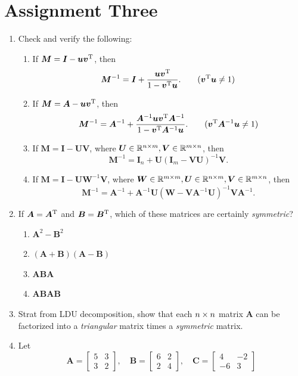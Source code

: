 \section{Assignment Three}
\begin{enumerate}
\item
Check and verify the following:
\begin{enumerate}
\item
If $\bm M=\bm I-\bm u\bm v^{\mathrm T}$, then \[\bm M^{-1}=\bm I+\frac{\bm u\bm v^{\mathrm T}}{1-\bm v^{\mathrm T}\bm u}.\qquad(\bm v^{\mathrm T}\bm u\ne1)\]
\item
If $\bm M=\bm A-\bm u\bm v^{\mathrm T}$, then \[\bm M^{-1}=\bm A^{-1}+\frac{\bm A^{-1}\bm u\bm v^{\mathrm T}\bm A^{-1}}{1-\bm v^{\mathrm T}\bm A^{-1}\bm u}.\qquad(\bm v^{\mathrm T}\bm A^{-1}\bm u\ne1)\]
\item
If $\bm M=\bm I-\bm U\bm V$, where $\bm U\in\mathbb{R}^{n\times m},\bm V\in\mathbb{R}^{m\times n}$, then \[\bm M^{-1}=\bm I_n+\bm U(\bm I_m-\bm V\bm U)^{-1}\bm V.\]
\item
If $\bm M=\bm I-\bm U\bm W^{-1}\bm V$, where $\bm W\in\mathbb{R}^{m\times m},\bm U\in\mathbb{R}^{n\times m},\bm V\in\mathbb{R}^{m\times n}$, then \[\bm M^{-1}=\bm A^{-1}+\bm A^{-1}\bm U(\bm W-\bm V\bm A^{-1}\bm U)^{-1}\bm V\bm A^{-1}.\]
\end{enumerate}
\item
If $\bm A=\bm A^{\mathrm T}$ and $\bm B=\bm B^{\mathrm T}$, which of these matrices are certainly \textit{symmetric}?
\begin{enumerate}
\item
$\bm A^2-\bm B^2$
\item
$(\bm A+\bm B)(\bm A-\bm B)$
\item
$\bm{ABA}$
\item
$\bm{ABAB}$
\end{enumerate}
\item
Strat from LDU decomposition, show that each $n\times n$ matrix $\bm A$ can be factorized into a \textit{triangular} matrix times a \textit{symmetric} matrix.
\item
Let
\[
\bm A=\begin{bmatrix}
5&3\\3&2
\end{bmatrix},\quad\bm B=\begin{bmatrix}
6&2\\2&4
\end{bmatrix},\quad\bm C=\begin{bmatrix}
4&-2\\-6&3
\end{bmatrix}
\]
\end{enumerate}

